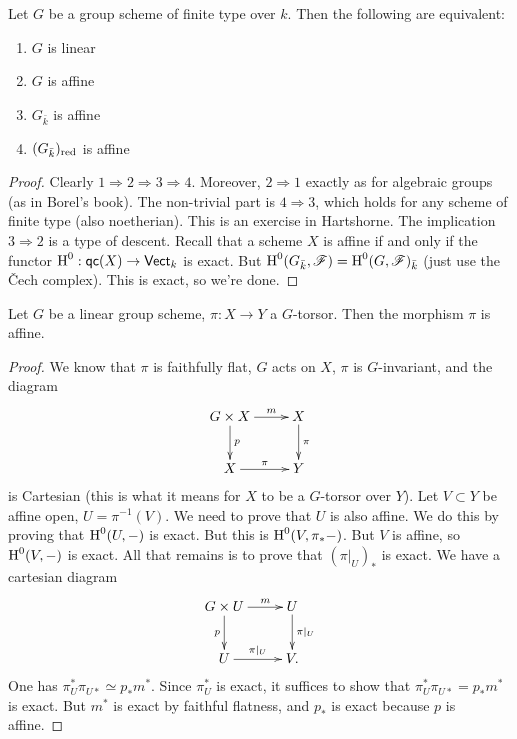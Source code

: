 \begin{lemm}
Let $G$ be a group scheme of finite type over $k$. Then the following are 
equivalent:
\begin{enumerate}
  \item $G$ is linear
  \item $G$ is affine 
  \item $G_{\bar k}$ is affine
  \item $(G_{\bar k})_{\mathrm{red}}$ is affine
\end{enumerate}
\end{lemm}
\begin{proof}
Clearly $1 \Rightarrow 2 \Rightarrow3\Rightarrow 4$. Moreover, 
$2\Rightarrow 1$ exactly as for algebraic groups (as in Borel's book). The 
non-trivial part is $4\Rightarrow 3$, which holds for any scheme of finite 
type (also noetherian). This is an exercise in Hartshorne. The implication 
$3\Rightarrow 2$ is a type of descent. Recall that a scheme $X$ is affine if 
and only if the functor $\operatorname{H}^0:\mathsf{qc}(X) \to \mathsf{Vect}_k$ is 
exact. But $\operatorname{H}^0(G_{\bar k},\mathscr{F}) = \operatorname{H}^0(G,\mathscr{F})_{\bar k}$ (just use the 
\v Cech complex). This is exact, so we're done. 
\end{proof}

\begin{lemm}
Let $G$ be a linear group scheme, $\pi:X\to Y$ a $G$-torsor. Then the morphism 
$\pi$ is affine. 
\end{lemm}
\begin{proof}
We know that $\pi$ is faithfully flat, $G$ acts on $X$, $\pi$ is $G$-invariant, 
and the diagram 
\[\xymatrix{
  G\times X \ar[r]^-m \ar[d]^-p 
    & X \ar[d]^-\pi \\
  X \ar[r]^-\pi 
    & Y
}\]
is Cartesian (this is what it means for $X$ to be a $G$-torsor over $Y$). 
Let $V\subset Y$ be affine open, $U=\pi^{-1}(V)$. We need to prove that 
$U$ is also affine. We do this by proving that $\operatorname{H}^0(U,-)$ is exact. But 
this is $\operatorname{H}^0(V,\pi_\ast -)$. But $V$ is affine, so $\operatorname{H}^0(V,-)$ is 
exact. All that remains is to prove that $(\pi|_U)_\ast$ is exact. We have a 
cartesian diagram 
\[\xymatrix{
  G\times U \ar[r]^-m \ar[d]_p 
    & U \ar[d]^-{\pi|_U} \\ 
  U \ar[r]^-{\pi|_U} 
    & V .
}\]
One has $\pi_U^\ast \pi_{U\ast} \simeq p_\ast m^\ast$. Since 
$\pi_U^\ast$ is exact, it suffices to show that 
$\pi_U^\ast \pi_{U\ast} = p_\ast m^\ast$ is exact. But $m^\ast$ is exact by 
faithful flatness, and $p_\ast$ is exact because $p$ is affine. 
\end{proof}

